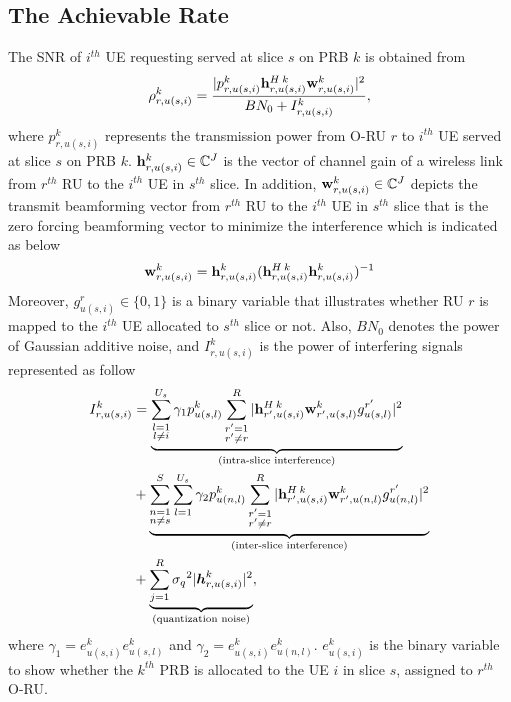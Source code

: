 \documentclass{article}
\begin{document}
\subsection{The Achievable Rate}
The SNR of $i^{th}$ UE requesting served at slice $s$ on PRB $k$ is obtained from
\begin{equation}\label{eq2}
\rho_{r,u(s,i)}^{k} =  \frac{|p_{r,u(s,i)}^{k}{\bold{h}_{r,u(s,i)}^{H \: k}} \bold{w}_{r,u(s,i)}^{k}|^2}{BN_0 + I_{r,u(s,i)}^{k}},
\end{equation} 
where $p_{r,u(s,i)}^{k}$ represents the transmission power from O-RU $r$ to $i^{th}$ UE served at slice $s$ on PRB $k$. 
${\bold{h}_{r,u(s,i)}^{k}} \in \mathbb{C}^{J}$ is the vector of channel gain of a wireless link from 
$r^{th}$ RU to the $i^{th}$ UE in $s^{th}$ slice. In addition, $\bold{w}_{r,u(s,i)}^{k} \in \mathbb{C}^{J}$ depicts the  transmit beamforming vector from $r^{th}$ RU to the $i^{th}$ UE in $s^{th}$ slice that is the zero forcing beamforming vector to minimize the interference which is indicated as below
\begin{equation}
\bold{w}_{r,u(s,i)}^{k} = {\bold{h}_{r,u(s,i)}^{k}}({\bold{h}_{r,u(s,i)}^{H \: k}} {\bold{h}_{r,u(s,i)}^{k}})^{-1}
\end{equation}
Moreover, $g_{u(s,i)}^r \in \{0,1\}$ is a binary variable that illustrates whether RU $r$ is mapped to the $i^{th}$ UE allocated to $s^{th}$ slice or not. 
Also, $BN_0$ denotes the power of Gaussian additive noise, and $I_{r,u(s,i)}^{k}$ is the power of interfering signals represented as follow
\begin{equation}\label{eqI}
\begin{split}
I_{r,u(s,i)}^{k} &=
 \underbrace{\sum_{\substack{l=1 \\ l\neq i}}^{{U}_{s}} \gamma_{1}  p_{u(s,l)}^{k}\sum_{\substack{r'=1 \\ r'\neq r}}^{R}|{\bold{h}_{r',u(s,i)}^{H \: k}} \bold{w}_{r',u(s,l)}^{k} g_{u(s,l)}^{r'}|^2}_{\text{(intra-slice interference)}}\\
&+ \underbrace{\sum_{\substack{n = 1 \\ n\neq s}}^{S}\sum_{l=1}^{{U}_s} \gamma_{2}  p_{u(n,l)}^{k}\sum_{\substack{r'=1 \\ r'\neq r}}^{R}|{\bold{h}_{r',u(s,i)}^{H \: k}} \bold{w}_{r',u(n,l)}^{k} g_{u(n,l)}^{r'}|^2}_{\text{(inter-slice interference)}}\\
&+\underbrace{  \sum_{j=1}^{{R}} {\sigma_q}^2 |\boldsymbol{h}_{r,{u(s,i)}}^k|^2 }_{\text{(quantization noise)}},
\end{split}
\end{equation}
where $\gamma_{1} = e^{k}_{u(s,i)}e^{k}_{u(s,l)}$ and $\gamma_{2} = e^{k}_{u(s,i)}e^{k}_{u(n,l)}$.
$e^{k}_{u(s,i)}$ is the binary variable to show whether the $k^{th}$ PRB is allocated to the UE $i$ in slice $s$, assigned to $r^{th}$ O-RU.
\end{document}
